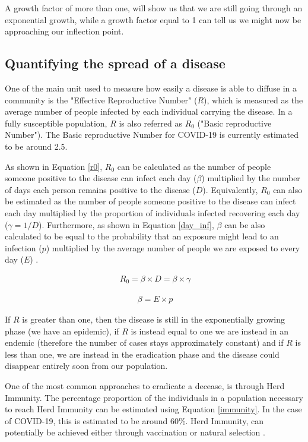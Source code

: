 A growth factor of more than one, will show us that we are still going through an exponential growth, while a growth factor equal to 1 can tell us we might now be approaching our inflection point.

\subsection{Quantifying the spread of a disease}
One of the main unit used to measure how easily a disease is able to diffuse in a community is the "Effective Reproductive Number" ($R$), which is measured as the average number of people infected by each individual carrying the disease. In a fully susceptible population, $R$ is also referred as $R_{0}$ ("Basic reproductive Number"). The Basic reproductive Number for COVID-19 is currently estimated to be around 2.5.

As shown in Equation \ref{r0}, $R_{0}$ can be calculated as the number of people someone positive to the disease can infect each day ($\beta$) multiplied by the number of days each person remains positive to the disease ($D$). Equivalently, $R_{0}$ can also be estimated as the number of people someone positive to the disease can infect each day multiplied by the proportion of individuals infected recovering each day ($\gamma = 1/D$). Furthermore, as shown in Equation \ref{day_inf}, $\beta$ can be also calculated to be equal to the probability that an exposure might lead to an infection ($p$) multiplied by the average number of people we are exposed to every day ($E$) \cite{tds}.

\useshortskip
\begin{align}
\ R_{0} = \beta \times D = \beta \times \gamma
\label{r0}
\end{align}
\useshortskip

\useshortskip
\begin{align}
\ \beta = E \times p
\label{day_inf}
\end{align}
\useshortskip

If $R$ is greater than one, then the disease is still in the exponentially growing phase (we have an epidemic), if $R$ is instead equal to one we are instead in an endemic (therefore the number of cases stays approximately constant) and if $R$ is less than one, we are instead in the eradication phase and the disease could disappear entirely soon from our population.

One of the most common approaches to eradicate a decease, is through Herd Immunity. The percentage proportion of the individuals in a population necessary to reach Herd Immunity can be estimated using Equation \ref{immunity}. In the case of COVID-19, this is estimated to be around 60\%. Herd Immunity, can potentially be achieved either through vaccination or natural selection \cite{blob}.

